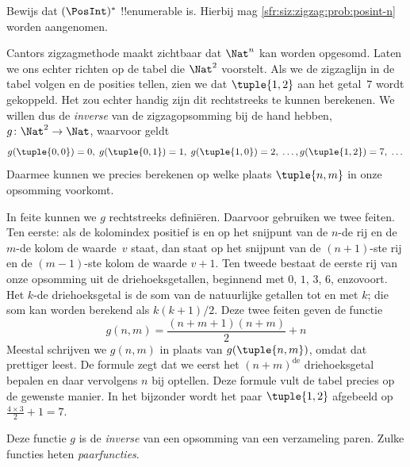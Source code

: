 \documentclass[openany]{memoir}
\begin{document}
\begin{prob}\label{sfr:siz:zigzag:prob:posint-star}
  Bewijs dat $(\PosInt)^*$ !!{enumerable} is. Hierbij mag
  \cref{sfr:siz:zigzag:prob:posint-n} worden aangenomen.
\end{prob}
\endgroup

\begingroup
\def\olfilename{OLP-0031}
\def\olfilepath{content/sets-functions-relations/size-of-sets/}
\hypertarget{unit-OLP-0031}{}




\begin{explain}
Cantors zigzagmethode maakt zichtbaar dat $\Nat^n$ kan worden opgesomd. Laten
we ons echter richten op de tabel die $\Nat^2$ voorstelt. Als we de
zigzaglijn in de tabel volgen en de posities tellen, zien we dat
$\tuple{1,2}$ aan het getal~$7$ wordt gekoppeld. Het zou echter handig
zijn dit rechtstreeks te kunnen berekenen. We willen dus de
\emph{inverse} van de zigzagopsomming bij de hand hebben,
$g\colon \Nat^2 \to \Nat$, waarvoor geldt
\[
g(\tuple{0,0}) = 0, \;
g(\tuple{0,1}) = 1, \;
g(\tuple{1,0}) = 2, \; \dots,  
g(\tuple{1,2}) = 7, \; \dots
\]
Daarmee kunnen we precies berekenen op welke plaats $\tuple{n, m}$ in
onze opsomming voorkomt.

In feite kunnen we $g$ rechtstreeks definiëren. Daarvoor gebruiken we
twee feiten. Ten eerste: als de kolomindex positief is en op het
snijpunt van de $n$-de rij en de $m$-de kolom de waarde~$v$ staat, dan
staat op het snijpunt van de
$(n+1)$-ste rij en de $(m-1)$-ste kolom de waarde $v + 1$. Ten tweede
bestaat de eerste rij van onze opsomming uit de driehoeksgetallen,
beginnend met $0$, $1$, $3$, $6$, enzovoort. Het $k$-de
driehoeksgetal is de som van de natuurlijke getallen tot en met $k$; die som kan
worden berekend als $k(k+1)/2$. Deze twee feiten geven de functie
\[
  g(n,m) = \frac{(n+m+1)(n+m)}{2} + n
\]
Meestal schrijven we $g(n, m)$ in plaats van $g(\tuple{n, m})$, omdat
dat prettiger leest. De formule zegt dat we eerst het
$(n+m)^\text{de}$ driehoeksgetal bepalen en daar vervolgens $n$ bij
optellen. Deze formule vult de tabel precies op de gewenste manier. In het
bijzonder wordt het paar $\tuple{1, 2}$ afgebeeld op $\frac{4 \times 3}{2} +
1 = 7$.

Deze functie $g$ is de \emph{inverse} van een opsomming van een
verzameling paren. Zulke functies heten \emph{paarfuncties}.
\end{explain}
\end{document}
